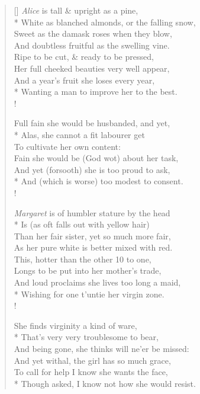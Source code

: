 \documentclass[MAIN]{subfiles}
\begin{document}
\settowidth{\versewidth}{\vin White as blanched almonds, or the falling snow,}
\begin{verse}[\versewidth]
\emph{Alice} is tall \& upright as a pine,\\*
\vin White as blanched almonds, or the falling snow,\\
\vin Sweet as the damask roses when they blow,\\
And doubtless fruitful as the swelling vine.\\
Ripe to be cut, \& ready to be pressed,\\
\vin Her full cheeked beauties very well appear,\\
\vin And a year's fruit she loses every year,\\*
Wanting a man to improve her to the best.\\!

Full fain she would be husbanded, and yet,\\*
Alas, she cannot a fit labourer get\\
\vin To cultivate her own content:\\
Fain she would be (God wot) about her task,\\
And yet (forsooth) she is too proud to ask,\\*
\vin And (which is worse) too modest to consent.\\!

\emph{Margaret} is of humbler stature by the head\\*
\vin Is (as oft falls out with yellow hair)\\
\vin Than her fair sister, yet so much more fair,\\
As her pure white is better mixed with red.\\
This, hotter than the other 10 to one,\\
\vin Longs to be put into her mother's trade,\\
\vin And loud proclaims she lives too long a maid,\\*
Wishing for one t'untie her virgin zone.\\!

She finds virginity a kind of ware,\\*
That's very very troublesome to bear,\\
\vin And being gone, she thinks will ne'er be missed:\\
And yet withal, the girl has so much grace,\\
To call for help I know she wants the face,\\*
\vin Though asked, I know not how she would resist.
\end{verse}
\end{document}
